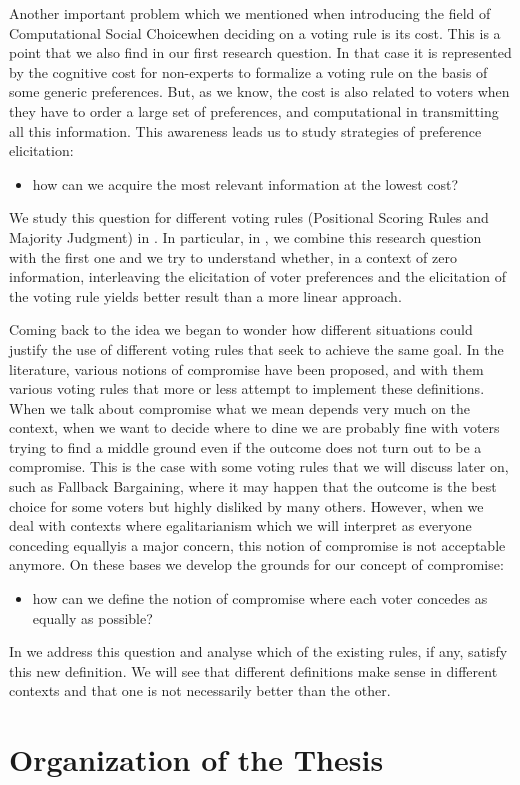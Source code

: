 Another important problem \textemdash which we mentioned when introducing the field of Computational Social Choice\textemdash when deciding on a voting rule is its cost. This is a point that we also find in our first research question. 
In that case it is represented by the cognitive cost for non-experts to formalize a voting rule on the basis of some generic preferences. But, as we know, the cost is also related to voters when they have to order a large set of preferences, and computational in transmitting all this information.
This awareness leads us to study strategies of preference elicitation:
\begin{itemize}
	\item how can we acquire the most relevant information at the lowest cost?
\end{itemize}
We study this question for different voting rules (Positional Scoring Rules and Majority Judgment) in . In particular, in , we combine this research question with the first one and we try to understand whether, in a context of zero information, interleaving the elicitation of voter preferences and the elicitation of the voting rule yields better result than a more linear approach.

Coming back to the idea  we began to wonder how different situations could justify the use of different voting rules that seek to achieve the same goal.
In the literature, various notions of compromise have been proposed, and with them various voting rules that more or less attempt to implement these definitions.
When we talk about compromise what we mean depends very much on the context, when we want to decide where to dine we are probably fine with voters trying to find a middle ground even if the outcome does not turn out to be a compromise. This is the case with some voting rules that we will discuss later on, such as Fallback Bargaining, where it may happen that the outcome is the best choice for some voters but highly disliked by many others.
However, when we deal with contexts where egalitarianism \textemdash which we will interpret as everyone conceding equally\textemdash is a major concern, this notion of compromise is not acceptable anymore.
On these bases we develop the grounds for our concept of compromise:
\begin{itemize}
	\item how can we define the notion of compromise where each voter concedes as equally as possible?
\end{itemize}
In  we address this question and analyse which of the existing rules, if any, satisfy this new definition. We will see that different definitions make sense in different contexts and that one is not necessarily better than the other.

\section{Organization of the Thesis}
